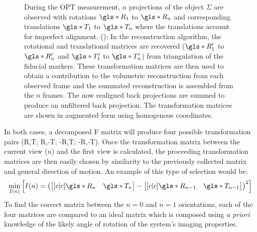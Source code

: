 \documentclass[times, twoside, watermark]{zHenriquesLab-StyleBioRxiv}
\begin{document}
\begin{figure}
{    During the \gls*{OPT} measurement, \(n\) projections of the object \(\Sigma \) are observed with rotations \(\gls*{R}_1\) to \(\gls*{R}_n\) and corresponding translations \(\gls*{T}_1\) to \(\gls*{T}_n\) where the translations account for imperfect alignment.
    (): In the reconstruction algorithm, the rotational and translational matrices are recovered (\(\gls*{R}_1'\) to \(\gls*{R}_n'\) and \(\gls*{T}_1'\) to \(\gls*{T}_n'\)) from triangulation of the fiducial markers.
    These transformation matrices are then used to obtain a contribution to the volumetric reconstruction from each observed frame and the summated reconstruction is assembled from the \(n\) frames.
    The now realigned back projections are summed to produce an unfiltered back projection.
    The transformation matrices are shown in augmented form using homogenous coordinates.
    }\label{fig:flopt_algorithm} %
\end{figure}


In both cases, a decomposed \gls*{F} matrix will produce four possible transformation pairs (\gls*{R},\gls*{T}; \gls*{R},-\gls*{T}; -\gls*{R},\gls*{T}; -\gls*{R},-\gls*{T}).
Once the transformation matrix between the current view (\(n\)) and the first view is calculated, the proceeding transformation matrices are then easily chosen by similarity to the previously collected matrix and general direction of motion.
An example of this type of selection would be:
\begin{align}
\min_{I(n)}\left[I(n) = \left(\begin{bmatrix}[c|c] \gls*{R}_n&\gls*{T}_n \end{bmatrix} - \begin{bmatrix}[c|c] \gls*{R}_{n-1}&\gls*{T}_{n-1} \end{bmatrix}\right)^2\right]
\end{align}
To find the correct matrix between the \(n=0\) and \(n=1\) orientations, each of the four matrices are compared to an ideal matrix which is composed using \emph{a priori} knowledge of the likely angle of rotation of the system's imaging properties.
\end{document}
